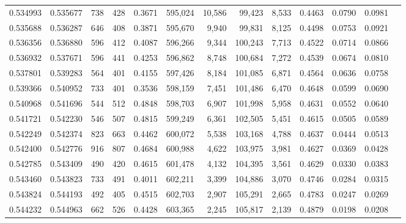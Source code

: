 \begin{tabular}{rrrrrrrrrrrrr}
0.534993 & 0.535677 &    738 &   428 &                                     0.3671 & 595,024 &  10,586 &  99,423 &   8,533 & 0.4463 & 0.0790 & 0.0981 \\
0.535688 & 0.536287 &    646 &   408 &                                     0.3871 & 595,670 &   9,940 &  99,831 &   8,125 & 0.4498 & 0.0753 & 0.0921 \\
0.536356 & 0.536880 &    596 &   412 &                                     0.4087 & 596,266 &   9,344 & 100,243 &   7,713 & 0.4522 & 0.0714 & 0.0866 \\
0.536932 & 0.537671 &    596 &   441 &                                     0.4253 & 596,862 &   8,748 & 100,684 &   7,272 & 0.4539 & 0.0674 & 0.0810 \\
0.537801 & 0.539283 &    564 &   401 &                                     0.4155 & 597,426 &   8,184 & 101,085 &   6,871 & 0.4564 & 0.0636 & 0.0758 \\
0.539366 & 0.540952 &    733 &   401 &                                     0.3536 & 598,159 &   7,451 & 101,486 &   6,470 & 0.4648 & 0.0599 & 0.0690 \\
0.540968 & 0.541696 &    544 &   512 &                                     0.4848 & 598,703 &   6,907 & 101,998 &   5,958 & 0.4631 & 0.0552 & 0.0640 \\
0.541721 & 0.542230 &    546 &   507 &                                     0.4815 & 599,249 &   6,361 & 102,505 &   5,451 & 0.4615 & 0.0505 & 0.0589 \\
0.542249 & 0.542374 &    823 &   663 &                                     0.4462 & 600,072 &   5,538 & 103,168 &   4,788 & 0.4637 & 0.0444 & 0.0513 \\
0.542400 & 0.542776 &    916 &   807 &                                     0.4684 & 600,988 &   4,622 & 103,975 &   3,981 & 0.4627 & 0.0369 & 0.0428 \\
0.542785 & 0.543409 &    490 &   420 &                                     0.4615 & 601,478 &   4,132 & 104,395 &   3,561 & 0.4629 & 0.0330 & 0.0383 \\
0.543460 & 0.543823 &    733 &   491 &                                     0.4011 & 602,211 &   3,399 & 104,886 &   3,070 & 0.4746 & 0.0284 & 0.0315 \\
0.543824 & 0.544193 &    492 &   405 &                                     0.4515 & 602,703 &   2,907 & 105,291 &   2,665 & 0.4783 & 0.0247 & 0.0269 \\
0.544232 & 0.544963 &    662 &   526 &                                     0.4428 & 603,365 &   2,245 & 105,817 &   2,139 & 0.4879 & 0.0198 & 0.0208 \\

\end{tabular}
